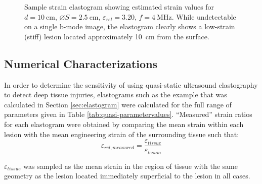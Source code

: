 			\begin{figure}[!htb]
				\centering
				\caption[Sample strain elastogram for a hard spherical lesion]{Sample strain elastogram showing estimated strain values for $d=\SI{10}{\cm}$, $\diameter S = \SI{2.5}{\cm}$, $\varepsilon_{rel} = 3.20$, $f = \SI{4}{\MHz}$. While undetectable on a single b-mode image, the elastogram clearly shows a low-strain (stiff) lesion located approximately \SI{10}{\cm} from the surface.}
				\label{fig:sample_elastogram}
			\end{figure}

		\subsection{Numerical Characterizations}
			\label{sec:numericalcharacterizations}
			In order to determine the sensitivity of using quasi-static ultrasound elastography to detect deep tissue injuries, elastograms such as the example that was calculated in Section \ref{sec:elastogram} were calculated for the full range of parameters given in Table \ref{tab:quasi-parametervalues}. ``Measured'' strain ratios for each elastogram were obtained by comparing the mean strain within each lesion with the mean engineering strain of the surrounding tissue such that:
			\begin{equation}
				\varepsilon_{rel,measured} = \frac{\varepsilon_{tissue}}{\varepsilon_{lesion}}
			\end{equation}

			$\varepsilon_{tissue}$ was sampled as the mean strain in the region of tissue with the same geometry as the lesion located immediately superficial to the lesion in all cases.

